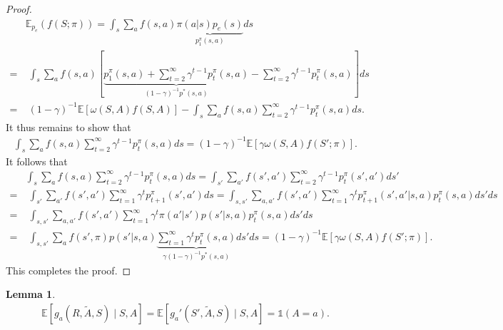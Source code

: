 \documentclass[12pt]{article}
\newcommand{\0}{\boldsymbol{0}}
\newtheorem{lemma}{Lemma}
\newcommand{\E}{\mathbb{E}}
\begin{document}
\begin{proof}
    \begin{align*}
        &\E_{p_e}(f(S;\pi))=\int_s \sum_a f(s,a) \underbrace{\pi(a|s) p_e(s)}_{p_1^\pi(s,a)} ds\\
       =& \; \int_s \sum_a f(s,a) \left[\underbrace{p_1^\pi(s,a)+\sum_{t=2}^\infty \gamma^{t-1} p_t^\pi(s,a)}_{(1-\gamma)^{-1}p^*(s,a)}-\sum_{t=2}^\infty \gamma^{t-1} p_t^\pi(s,a) \right] ds\\
       =& \; (1-\gamma)^{-1}\E\left[\omega(S,A)f(S,A) \right]-\int_s \sum_a f(s,a)\sum_{t=2}^\infty \gamma^{t-1} p_t^\pi(s,a) ds.
    \end{align*} It thus remains to show that \begin{gather*}
        \int_s \sum_a f(s,a)\sum_{t=2}^\infty \gamma^{t-1} p_t^\pi(s,a) ds=(1-\gamma)^{-1}\E\left[\gamma \omega(S,A) f(S';\pi)\right].
    \end{gather*} It follows that 
\begin{align*}
       &\int_s \sum_a f(s,a)\sum_{t=2}^\infty \gamma^{t-1} p_t^\pi(s,a) ds=\int_{s'} \sum_{a'} f(s',a')\sum_{t=2}^\infty \gamma^{t-1} p_{t}^\pi(s',a') ds'\\
       =& \; \int_{s'} \sum_{a'} f(s',a')\sum_{t=1}^\infty \gamma^{t} p_{t+1}^\pi(s',a') ds=\int_{s,s'} \sum_{a,a'} f(s',a')\sum_{t=1}^\infty \gamma^{t} p_{t+1}^\pi(s',a'|s,a)p_{t}^\pi(s,a) ds' ds\\
       =& \; \int_{s,s'} \sum_{a,a'} f(s',a')\sum_{t=1}^\infty \gamma^{t} \pi(a'|s')p(s'|s,a)p_{t}^\pi(s,a) ds' ds\\
         =& \; \int_{s,s'}  \sum_{a} f(s',\pi)p(s'|s,a) \underbrace{\sum_{t=1}^\infty \gamma^{t} p_{t}^\pi(s,a)}_{\gamma(1-\gamma)^{-1}p^*(s,a)} ds' ds=(1-\gamma)^{-1}\E\left[\gamma \omega(S,A) f(S';\pi)\right].
     \end{align*} This completes the proof.
\end{proof}


\begin{lemma} \label{lemma:indicator}
    \begin{gather*}
\E[g_a(R,\widetilde A, S)\mid S,A]=\E[g_a'(S',\widetilde A, S)\mid S,A]=\mathds 1(A=a).
    \end{gather*} 
\end{lemma}
\end{document}
